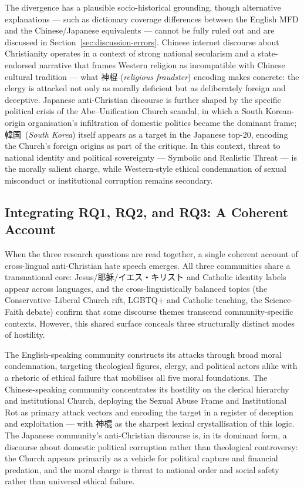 \documentclass[../CLthesis.tex]{subfiles}
\begin{document}
The divergence has a plausible socio-historical grounding, though alternative explanations --- such as dictionary coverage differences between the English MFD and the Chinese/Japanese equivalents --- cannot be fully ruled out and are discussed in Section~\ref{sec:discussion-errors}. Chinese internet discourse about Christianity operates in a context of strong national secularism and a state-endorsed narrative that frames Western religion as incompatible with Chinese cultural tradition --- what 神棍 (\textit{religious fraudster}) encoding makes concrete: the clergy is attacked not only as morally deficient but as deliberately foreign and deceptive. Japanese anti-Christian discourse is further shaped by the specific political crisis of the Abe--Unification Church scandal, in which a South Korean-origin organisation's infiltration of domestic politics became the dominant frame; 韓国~(\textit{South Korea}) itself appears as a target in the Japanese top-20, encoding the Church's foreign origins as part of the critique. In this context, threat to national identity and political sovereignty --- Symbolic and Realistic Threat --- is the morally salient charge, while Western-style ethical condemnation of sexual misconduct or institutional corruption remains secondary.

\subsection{Integrating RQ1, RQ2, and RQ3: A Coherent Account}

When the three research questions are read together, a single coherent account of cross-lingual anti-Christian hate speech emerges. All three communities share a transnational core: Jesus/耶稣/イエス・キリスト and Catholic identity labels appear across languages, and the cross-linguistically balanced topics (the Conservative--Liberal Church rift, LGBTQ+ and Catholic teaching, the Science--Faith debate) confirm that some discourse themes transcend community-specific contexts. However, this shared surface conceals three structurally distinct modes of hostility.

The English-speaking community constructs its attacks through broad moral condemnation, targeting theological figures, clergy, and political actors alike with a rhetoric of ethical failure that mobilises all five moral foundations. The Chinese-speaking community concentrates its hostility on the clerical hierarchy and institutional Church, deploying the Sexual Abuse Frame and Institutional Rot as primary attack vectors and encoding the target in a register of deception and exploitation --- with 神棍 as the sharpest lexical crystallisation of this logic. The Japanese community's anti-Christian discourse is, in its dominant form, a discourse about domestic political corruption rather than theological controversy: the Church appears primarily as a vehicle for political capture and financial predation, and the moral charge is threat to national order and social safety rather than universal ethical failure.
\end{document}
